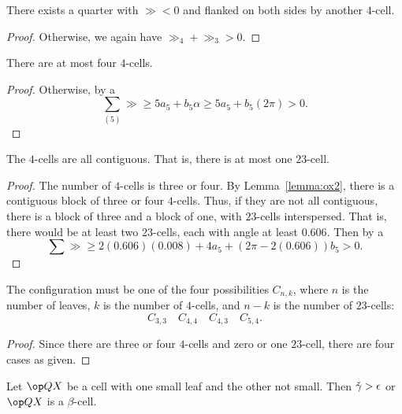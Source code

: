 \begin{lemma}\label{lemma:ox2} 
There exists a quarter with $\gg<0$ and flanked on both sides by another $4$-cell.
\end{lemma}

\begin{proof}
Otherwise, we again have $\gg_4+\gg_3>0$.
\end{proof}

\begin{lemma}\label{lemma:ox44} There are at most four $4$-cells.
\end{lemma}

\begin{proof}
  Otherwise, by a 
\[
\sum_{(5)} \gg \ge 5 a_5 + b_5\alpha \ge 5 a_5 +  b_5 (2\pi) > 0.
\]
\end{proof}

\begin{lemma}\label{lemma:oxC} The $4$-cells are all contiguous.  That is, there is at most one $23$-cell.
\end{lemma}

\begin{proof}
The number of $4$-cells is three or four.
By Lemma~\ref{lemma:ox2}, there is a contiguous block of three or four $4$-cells.  Thus,
if they are not all contiguous, there is a block of three and a block of one,
with $23$-cells interspersed.  That is, there would be at least two $23$-cells,
each with angle at least $0.606$.  Then by a 
\[
\sum \gg \ge 2 (0.606) (0.008) + 4 a_5 + (2\pi-2 (0.606)) b_5 > 0.
\]
\end{proof}

\begin{lemma}\label{lemma:ox-cases} The configuration must be one of the four possibilities $C_{n,k}$, where $n$ is the number of leaves, $k$ is the number of $4$-cells, and $n-k$ is the number of $23$-cells:
\[
C_{3,3}\quad C_{4,4}\quad C_{4,3}\quad C_{5,4}.
\]
\end{lemma}

\begin{proof} Since there are three or four $4$-cells and zero or one $23$-cell,
there are four cases as given.
\end{proof}

\begin{lemma} Let $\QX$ be a cell with one small leaf and the other not small.
Then $\check\gamma > \epsilon$ or $\QX$ is a $\beta$-cell.  
\end{lemma}

